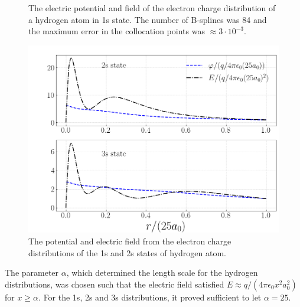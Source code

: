 \documentclass[twocolumn]{article}
\begin{document}
\begin{large}
\begin{figure}[b!]
    \caption{The electric potential and field of the electron charge distribution of a hydrogen atom in 1s state. The number of B-splines was 84 and the maximum error in the collocation points was $\approx 3\cdot 10^{-3}$.}
    \label{17apr0959}
    \includegraphics[scale=0.35]{Hydrogen_23.png}
    \caption{The potential and electric field from the electron charge distributions of the 1s and 2s states of hydrogen atom.}
    \label{18apr2008}
\end{figure}

\newpage
The parameter $\alpha$, which determined the length scale for the hydrogen distributions, was chosen such that the electric field satisfied $E\approx q/(4\pi\epsilon_0x^2a_0^2)$ for $x \geq \alpha$. For the 1s, 2s and 3s distributions, it proved sufficient to let $\alpha=25$.


\end{large}
\end{document}
